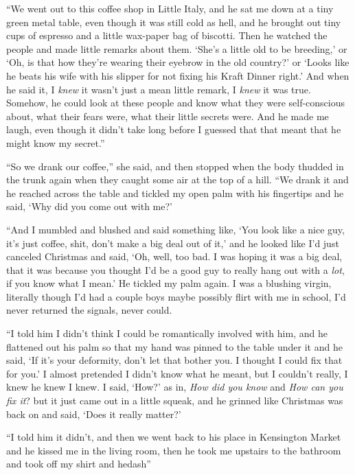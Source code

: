``We went out to this coffee shop in Little Italy, and he sat me down
at a tiny green metal table, even though it was still cold as hell,
and he brought out tiny cups of espresso and a little wax-paper bag of
biscotti.  Then he watched the people and made little remarks about
them.  `She's a little old to be breeding,' or `Oh, is that how
they're wearing their eyebrow in the old country?' or `Looks like he
beats his wife with his slipper for not fixing his Kraft Dinner
right.' And when he said it, I \textit{knew} it wasn't just a mean
little remark, I \textit{knew} it was true.  Somehow, he could look at
these people and know what they were self-conscious about, what their
fears were, what their little secrets were.  And he made me laugh,
even though it didn't take long before I guessed that that meant that
he might know my secret.''

``So we drank our coffee,'' she said, and then stopped when the body
thudded in the trunk again when they caught some air at the top of a
hill.  ``We drank it and he reached across the table and tickled my
open palm with his fingertips and he said, `Why did you come out with
me?'

``And I mumbled and blushed and said something like, `You look like a
nice guy, it's just coffee, shit, don't make a big deal out of it,'
and he looked like I'd just canceled Christmas and said, `Oh, well,
too bad.  I was hoping it was a big deal, that it was because you
thought I'd be a good guy to really hang out with a \textit{lot}, if
you know what I mean.' He tickled my palm again.  I was a blushing
virgin, literally though I'd had a couple boys maybe possibly flirt
with me in school, I'd never returned the signals, never could.

``I told him I didn't think I could be romantically involved with him,
and he flattened out his palm so that my hand was pinned to the table
under it and he said, `If it's your deformity, don't let that bother
you.  I thought I could fix that for you.' I almost pretended I didn't
know what he meant, but I couldn't really, I knew he knew I knew.  I
said, `How?' as in, \textit{How did you know} and \textit{How can you
fix it}?  but it just came out in a little squeak, and he grinned like
Christmas was back on and said, `Does it really matter?'

``I told him it didn't, and then we went back to his place in
Kensington Market and he kissed me in the living room, then he took me
upstairs to the bathroom and took off my shirt and hedash{}''

